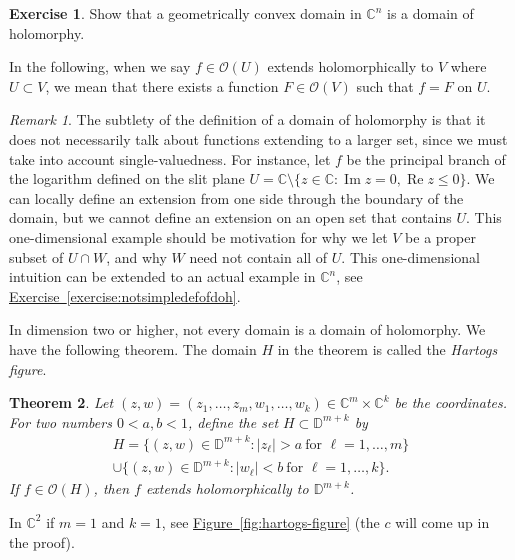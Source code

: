 \documentclass[12pt,openany]{book}
\renewcommand{\Re}{\operatorname{Re}}
\renewcommand{\Im}{\operatorname{Im}}
\newcommand{\sabs}[1]{\lvert {#1} \rvert}
\newcommand{\C}{{\mathbb{C}}}
\newcommand{\D}{{\mathbb{D}}}
\newcommand{\sO}{{\mathscr{O}}}
\newcommand{\myindex}[1]{#1\index{#1}}
\theoremstyle{plain}
\newtheorem{thm}{Theorem}[section]
\theoremstyle{remark}
\newtheorem{remark}[thm]{Remark}
\theoremstyle{definition}
\newenvironment{exbox}{%
    \def\FrameCommand{\vrule width 1pt \relax\hspace{10pt}}%
    \MakeFramed{\advance\hsize-\width\FrameRestore}%
}{%
    \endMakeFramed
}
\theoremstyle{exercise}
\newtheorem{exercise}{Exercise}[section]
\theoremstyle{example}
\newcommand{\figureref}[1]{\hyperref[#1]{Figure~\ref*{#1}}}
\newcommand{\exerciseref}[1]{\hyperref[#1]{Exercise~\ref*{#1}}}
\begin{document}
\begin{exbox}
\begin{exercise}
Show that a geometrically convex domain in $\C^n$ is a domain of holomorphy.
\end{exercise}
\end{exbox}

In the following, when we say $f \in \sO(U)$ extends holomorphically to $V$ where
$U \subset V$, we mean that there
exists a function $F \in \sO(V)$ such that $f = F$ on
$U$.

\begin{remark} \label{remark:notsimpledefofdoh}
The subtlety of the definition of a domain of holomorphy is that it does not
necessarily talk about functions extending to a larger set, since we must
take into account single-valuedness.  For instance, let $f$ be the principal branch
of the logarithm defined on the slit plane
$U = \C \setminus \{ z \in \C : \Im z = 0, \Re z \leq 0 \}$.
We can locally define an extension from one side through the boundary
of the domain, but we cannot define an extension on an open set that
contains $U$.  This one-dimensional example should be motivation for why we let $V$
be a proper subset of $U \cap W$, and why $W$ need not contain all of $U$.
This one-dimensional intuition can be extended to an actual example in
$\C^n$, see \exerciseref{exercise:notsimpledefofdoh}.
\end{remark}

In dimension two or higher, not every domain is a domain of holomorphy.  We have
the following theorem.  The domain $H$ in the theorem is called the
\emph{\myindex{Hartogs figure}}.

\begin{thm} \label{thm:extensionhartogsfigure}
Let $(z,w) = (z_1,\ldots,z_m,w_{1},\ldots,w_{k}) \in \C^m \times \C^k$ be the coordinates.  For two numbers
$0 < a,b < 1$, define the set $H \subset \D^{m+k}$
by
\begin{multline*}
H = \bigl\{ (z,w) \in \D^{m+k} : \sabs{z_\ell} > a ~\text{for $\ell=1,\ldots,m$}
\bigr\}
\\
\cup
\bigl\{ (z,w) \in \D^{m+k} : \sabs{w_\ell} < b ~\text{for $\ell=1,\ldots,k$}
\bigr\} .
\end{multline*}
If $f \in \sO(H)$, then $f$ extends holomorphically to $\D^{m+k}$.
\end{thm}

In $\C^2$ if $m=1$ and $k=1$, see
\figureref{fig:hartogs-figure} (the $c$ will come up in
the proof).
\end{document}
